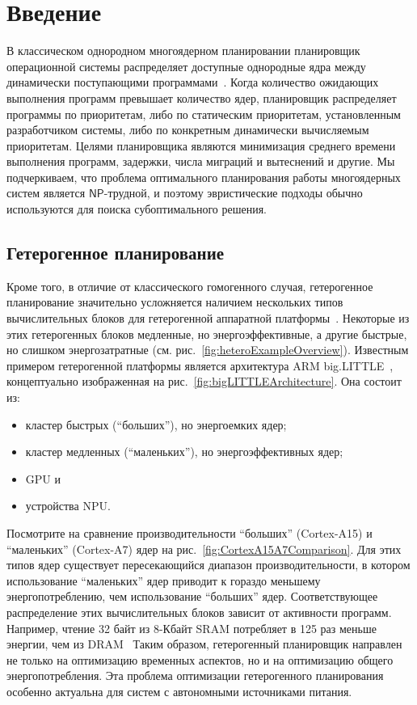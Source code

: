 \chapter{Введение}
\label{chap:intro}

В классическом однородном многоядерном планировании планировщик операционной системы распределяет доступные однородные ядра между динамически поступающими программами~\cite{Anderson2006}. Когда количество ожидающих выполнения программ превышает количество ядер, планировщик распределяет программы по приоритетам, либо по статическим приоритетам, установленным разработчиком системы, либо по конкретным динамически вычисляемым приоритетам. Целями планировщика являются минимизация среднего времени выполнения программ, задержки, числа миграций и вытеснений и другие. Мы подчеркиваем, что проблема оптимального планирования работы многоядерных систем является $\mathsf{NP}$-трудной, и поэтому эвристические подходы обычно используются для поиска субоптимального решения.

\section{Гетерогенное планирование}
Кроме того, в отличие от классического гомогенного случая, гетерогенное планирование значительно усложняется наличием нескольких типов вычислительных блоков для гетерогенной аппаратной платформы~\cite{Radulescu2000}. Некоторые из этих гетерогенных блоков медленные, но энергоэффективные, а другие быстрые, но слишком энергозатратные (см. рис.~\ref{fig:heteroExampleOverview}). Известным примером гетерогенной платформы является архитектура ARM big.LITTLE~\cite{Padoin2015}, концептуально изображенная на рис.~\ref{fig:bigLITTLEArchitecture}. Она состоит из:
\begin{itemize}
\item кластер быстрых (``больших''), но энергоемких ядер;
\item кластер медленных (``маленьких''), но энергоэффективных ядер;
\item GPU и
\item устройства NPU.
\end{itemize}
Посмотрите на сравнение производительности ``больших'' (Cortex-A15) и ``маленьких'' (Cortex-A7) ядер на рис.~\ref{fig:CortexA15A7Comparison}. Для этих типов ядер существует пересекающийся диапазон производительности, в котором использование ``маленьких'' ядер приводит к гораздо меньшему энергопотреблению, чем использование ``больших'' ядер.
Соответствующее распределение этих вычислительных блоков зависит от активности программ. Например, чтение 32 байт из 8-Кбайт SRAM потребляет в 125 раз меньше энергии, чем из DRAM~\cite{Hennessy2017}
Таким образом, гетерогенный планировщик направлен не только на оптимизацию временных аспектов, но и на оптимизацию общего энергопотребления. Эта проблема оптимизации гетерогенного планирования особенно актуальна для систем с автономными источниками питания.

